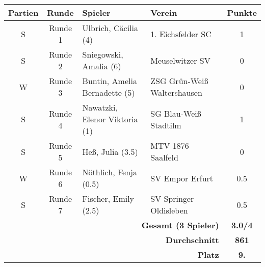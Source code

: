 \begin{tabular}{|c|c|l|l|c|}
\hline
\textbf{Partien} & \textbf{Runde} & \textbf{Spieler} & \textbf{Verein} & \textbf{Punkte} \\ \hline
S & Runde 1 & Ulbrich, Cäcilia (4) & 1. Eichsfelder SC & 1 \\ \hline
S & Runde 2 & Sniegowski, Amalia (6) & Meuselwitzer SV & 0 \\ \hline
W & Runde 3 & Buntin, Amelia Bernadette (5) & ZSG Grün-Weiß Waltershausen & 0 \\ \hline
S & Runde 4 & Nawatzki, Elenor Viktoria (1) & SG Blau-Weiß Stadtilm & 1 \\ \hline
S & Runde 5 & Heß, Julia (3.5) & MTV 1876 Saalfeld & 0 \\ \hline
W & Runde 6 & Nöthlich, Fenja (0.5) & SV Empor Erfurt & 0.5 \\ \hline
S & Runde 7 & Fischer, Emily (2.5) & SV Springer Oldisleben & 0.5 \\ \hline
\multicolumn{4}{|r|}{\textbf{Gesamt (3 Spieler)}} & \textbf{3.0/4} \\ \hline
\multicolumn{4}{|r|}{\textbf{Durchschnitt}} & \textbf{861} \\ \hline
\multicolumn{4}{|r|}{\textbf{Platz}} & \textbf{9.} \\ \hline
\end{tabular}
